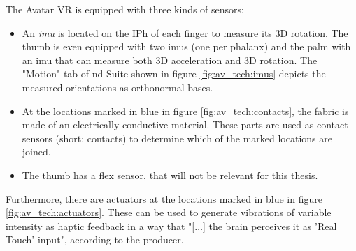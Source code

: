 \documentclass[hyperref, bachelorofscience]{cgvpub}
\begin{document}
The Avatar VR is equipped with three kinds of sensors: 
\vspace{.3cm}
\begin{itemize}
	\item An \emph{\acrfull{imu}} is located on the \gls{IPh} of each finger to measure its 3D rotation. The thumb is even equipped with two \acrshort{imu}s (one per phalanx) and the palm with an \acrshort{imu} that can measure both 3D acceleration and 3D rotation. The "Motion" tab of \acrshort{nd} Suite shown in figure \ref{fig:av_tech:imus} depicts the measured orientations as orthonormal bases. 
	\item At the locations marked in blue in figure \ref{fig:av_tech:contacts}, the fabric is made of an electrically conductive material. These parts are used as contact sensors (short: contacts) to determine which of the marked locations are joined.
	\item The thumb has a flex sensor, that will not be relevant for this thesis.
\end{itemize}

Furthermore, there are actuators at the locations marked in blue in figure \ref{fig:av_tech:actuators}. These can be used to generate vibrations of variable intensity as haptic feedback in a way that "[$\dots$] the brain perceives it as 'Real Touch' input", according to the producer.
\end{document}
